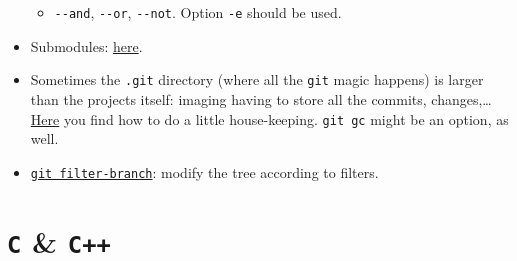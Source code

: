 \documentclass[a4paper,12pt,%
              final%
              ]{article}
\begin{document}
\begin{itemize}
\begin{itemize}
      \item \verb|--and|, \verb|--or|, \verb|--not|. Option \verb|-e| should be used.
    \end{itemize}
  \item Submodules: \href{https://git-scm.com/book/en/v2/Git-Tools-Submodules}{here}.
  \item Sometimes the \texttt{.git} directory (where all the \texttt{git} magic happens) is larger than the projects itself: imaging having to store all the commits, changes,\ldots{} \href{https://stackoverflow.com/questions/5277467/how-can-i-clean-my-git-folder-cleaned-up-my-project-directory-but-git-is-sti}{Here} you find how to do a little house-keeping. \verb|git gc| might be an option, as well.
  \item \href{https://git-scm.com/docs/git-filter-branch}{\texttt{git filter-branch}}: modify the tree according to filters.

\end{itemize}


\section{\texttt{C} \& \texttt{C++}}
\label{sec:c}
\end{document}
